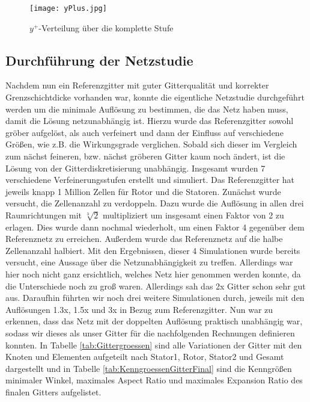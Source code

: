 \begin{figure}[H]
	\centering
    
	\texttt{[image: yPlus.jpg]}
	\caption{$y^+$-Verteilung über die komplette Stufe} \label{imgYplusWerte}
\end{figure}

\subsection{Durchführung der Netzstudie}

Nachdem nun ein Referenzgitter mit guter Gitterqualität und korrekter Grenzschichtdicke vorhanden war, konnte die eigentliche Netzstudie durchgeführt werden um die minimale Auflösung zu bestimmen, die das Netz haben muss, damit die Lösung netzunabhängig ist. Hierzu wurde das Referenzgitter sowohl gröber aufgelöst, als auch verfeinert und dann der Einfluss auf verschiedene Größen, wie z.B. die Wirkungsgrade verglichen. Sobald sich dieser im Vergleich zum nächst feineren, bzw. nächst gröberen Gitter kaum noch ändert, ist die Lösung von der Gitterdiskretisierung unabhängig. 
Insgesamt wurden 7 verschiedene Verfeinerungsstufen erstellt und simuliert. Das Referenzgitter hat jeweils knapp 1 Million Zellen für Rotor und die Statoren. Zunächst wurde versucht, die Zellenanzahl zu verdoppeln. Dazu wurde die Auflösung in allen drei Raumrichtungen mit $\sqrt[3]{2}$ multipliziert um insgesamt einen Faktor von 2 zu erlagen. Dies wurde dann nochmal wiederholt, um einen Faktor 4 gegenüber dem Referenznetz zu erreichen. Außerdem wurde das Referenznetz auf die halbe Zellenanzahl halbiert. Mit den Ergebnissen, dieser 4 Simulationen wurde bereits versucht, eine Aussage über die Netzunabhängigkeit zu treffen. Allerdings war hier noch nicht ganz ersichtlich, welches Netz hier genommen werden konnte, da die Unterschiede noch zu groß waren. Allerdings sah das 2x Gitter schon sehr gut aus. Daraufhin führten wir noch drei weitere Simulationen durch, jeweils mit den Auflösungen 1.3x, 1.5x und 3x in Bezug zum Referenzgitter. Nun war zu erkennen, dass das Netz mit der doppelten Auflösung praktisch unabhängig war, sodass wir dieses als unser Gitter für die nachfolgenden Rechnungen definieren konnten. 
In Tabelle \ref{tab:Gittergroessen} sind alle Variationen der Gitter mit den Knoten und Elementen aufgeteilt nach Stator1, Rotor, Stator2 und Gesamt dargestellt und in Tabelle \ref{tab:KenngroessenGitterFinal}  sind die Kenngrößen minimaler Winkel, maximales Aspect Ratio und maximales Expansion Ratio des finalen Gitters aufgelistet.

